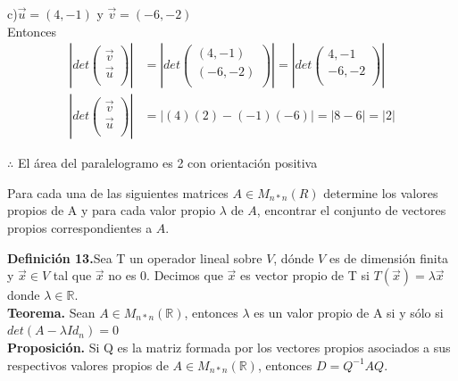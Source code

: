 \documentclass[letterpaper]{article}
\renewcommand{\*}{\cdot}
\theoremstyle{definition}
\begin{document}
	c)$\vec{u}  = (4,-1)$ y $\vec{v}  = (-6,-2)$\\
	Entonces
	\begin{align*}
		\left| det\begin{pmatrix}
		\vec{v}\\
		\vec{u}\\
		\end{pmatrix} \right| & = \left| det\begin{pmatrix}
		(4,-1)\\
		(-6,-2)\\
		\end{pmatrix} \right| = \left| det\begin{pmatrix}
		4,-1\\
		-6,-2\\
		\end{pmatrix} \right|\\
		\left| det\begin{pmatrix}
		\vec{v}\\
		\vec{u}\\
		\end{pmatrix} \right| & = |(4)(2)-(-1)(-6)| = |8-6| = |2|
	\end{align*}
	\begin{center}
		$ \therefore $ El área del paralelogramo es 2 con orientación positiva
	\end{center}
	\begin{ejercicio}{16}
		Para cada una de las siguientes matrices $A\in M_{n*n}(R)$ determine los valores propios de A y para cada valor propio $\lambda$ de $A$, encontrar el conjunto de vectores propios correspondientes a $A$.
	\end{ejercicio}
	\textbf{Definición 13.}Sea T un operador lineal sobre $V$, dónde $V$ es de dimensión finita y $\vec{x}\in V$ tal que $\vec{x}$ no es 0. Decimos que $\vec{x}$ es vector propio de T si $T(\vec{x})= \lambda\vec{x}$ donde $\lambda\in \mathbb{R}$.\\
	\textbf{Teorema.} Sean $A\in M_{n*n}(\mathbb{R})$, entonces $\lambda$ es un valor propio de A si y sólo si $det(A-\lambda Id_{n})=0$\\
	\textbf{Proposición.} Si Q es la matriz formada por los vectores propios asociados a sus respectivos valores propios de $A\in M_{n*n}(\mathbb{R})$, entonces $D=Q^{-1}AQ$.\\
	
\end{document}
